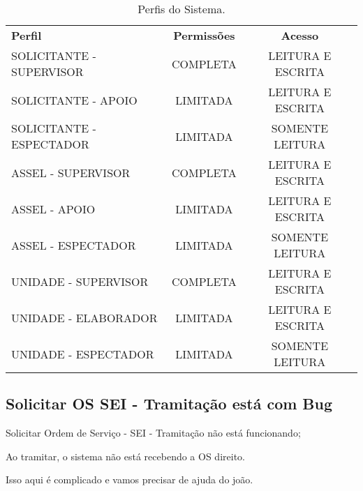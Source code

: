 \begin{table}[!h]
	\begin{center}
		\begin{tabular}{|p{}|c|c|}
			\hline
			\rowcolor{lightgray!50} \multicolumn{3}{|c|}{\Large PERFIS \normalsize} \\ \hline \hline
			\rowcolor{lightgray}\textbf{Perfil} & \textbf{Permissões} & \textbf{Acesso} \\ \hline
			\rowcolor{corCOULD!10} SOLICITANTE - SUPERVISOR  & COMPLETA & LEITURA E ESCRITA  \\ \hline
			\rowcolor{corCOULD!10} SOLICITANTE - APOIO  & LIMITADA & LEITURA E ESCRITA  \\ \hline
			\rowcolor{corCOULD!10} SOLICITANTE - ESPECTADOR  & LIMITADA & SOMENTE LEITURA  \\ \hline 
			\hline
			
			
			\rowcolor{corCOULD!20} ASSEL - SUPERVISOR  & COMPLETA & LEITURA E ESCRITA  \\ \hline
			\rowcolor{corCOULD!20} ASSEL - APOIO  & LIMITADA & LEITURA E ESCRITA  \\ \hline
			\rowcolor{corCOULD!20} ASSEL - ESPECTADOR  & LIMITADA & SOMENTE LEITURA  \\ \hline 
			\hline
			
			\rowcolor{corWOULD!20} UNIDADE - SUPERVISOR  & COMPLETA & LEITURA E ESCRITA  \\ \hline
			\rowcolor{corWOULD!20} UNIDADE - ELABORADOR  & LIMITADA & LEITURA E ESCRITA  \\ \hline
			\rowcolor{corWOULD!20} UNIDADE - ESPECTADOR  & LIMITADA & SOMENTE LEITURA  \\ \hline 
			\hline
			
		\end{tabular}    
		\caption{\label{tab:perfis:mapeamento} Perfis do Sistema.}
	\end{center}
\end{table}



\subsection{Solicitar OS SEI - Tramitação está com Bug}

Solicitar Ordem de Serviço - SEI - Tramitação não está funcionando;

Ao tramitar, o sistema não está recebendo a OS direito.

Isso aqui é complicado e vamos precisar de ajuda do joão.

